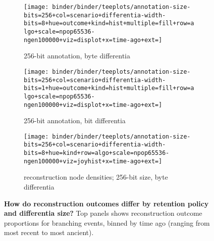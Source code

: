 \begin{figure*}
  \centering

\begin{minipage}{\textwidth}
\begin{subfigure}[b]{0.4\textwidth}
\centering
\texttt{[image: binder/binder/teeplots/annotation-size-bits=256+col=scenario+differentia-width-bits=8+hue=outcome+kind=hist+multiple=fill+row=algo+scale=npop65536-ngen100000+viz=displot+x=time-ago+ext=]}
\caption{256-bit annotation, byte differentia}
\end{subfigure}%
\begin{subfigure}[b]{0.6\textwidth}
\centering
\texttt{[image: binder/binder/teeplots/annotation-size-bits=256+col=scenario+differentia-width-bits=1+hue=outcome+kind=hist+multiple=fill+row=algo+scale=npop65536-ngen100000+viz=displot+x=time-ago+ext=]}
\caption{256-bit annotation, bit differentia}
\end{subfigure}
\end{minipage}
  \begin{subfigure}[b]{\textwidth}
    \centering
    \texttt{[image: binder/binder/teeplots/annotation-size-bits=256+col=scenario+differentia-width-bits=8+hue=kind+row=algo+scale=npop65536-ngen100000+viz=joyhist+x=time-ago+ext=]}
    \caption{reconstruction node densities; 256-bit size, byte differentia}
  \end{subfigure}%
  \caption{%
  \textbf{How do reconstruction outcomes differ by retention policy and differentia size?}
  Top panels shows reconstruction outcome proportions for branching events, binned by time ago (ranging from most recent to most ancient).
}
\end{figure*}
